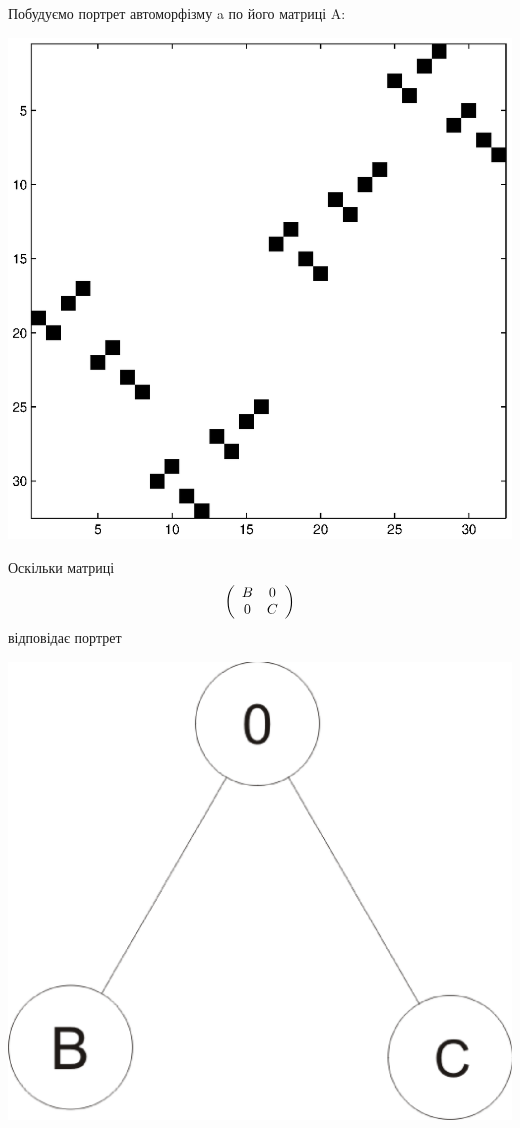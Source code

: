 \documentclass[a4paper,12pt]{article} \usepackage{a4wide}
\numberwithin{equation}{subsection}
\begin{document}
Побудуємо портрет автоморфізму a по його матриці A:
\begin{center}
\includegraphics[scale=0.3]{m2p.eps}
\end{center}
 Оскільки матриці
\[
\left( {\begin{array}{*{20}c}
   B & 0  \\
   0 & C  \\
\end{array}} \right)
\]
відповідає портрет
 \begin{center}
\includegraphics[scale=0.25]{port0ab.eps}
\end{center}
\end{document}
